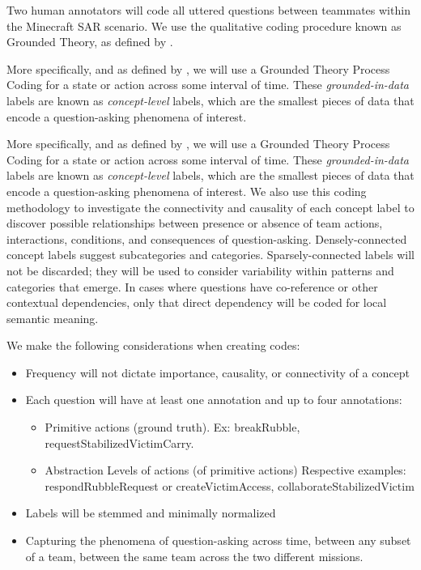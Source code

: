 Two human annotators will code all uttered questions between teammates within
the Minecraft SAR scenario.  We use the qualitative coding procedure known as
Grounded Theory, as defined by \citet{corbin_strauss_2015}. 

More specifically, and as defined by \citet{saldana_2021}, we will use a
Grounded Theory Process Coding for a state or action across some interval of
time. These \emph{grounded-in-data} labels are known as \emph{concept-level}
labels, which are the smallest pieces of data that encode a question-asking
phenomena of interest.

More specifically, and as defined by \citet{saldana_2021}, we will use a
Grounded Theory Process Coding for a state or action across some interval of
time. These \emph{grounded-in-data} labels are known as \emph{concept-level}
labels, which are the smallest pieces of data that encode a question-asking
phenomena of interest. We also use this coding methodology to investigate the connectivity and
causality of each concept label to discover possible relationships between
presence or absence of team actions, interactions, conditions, and consequences
of question-asking. Densely-connected concept labels suggest subcategories and
categories. Sparsely-connected labels will not be discarded; they will be used
to consider variability within patterns and categories that emerge. In cases
where questions have co-reference or other contextual dependencies, only that
direct dependency will be coded for local semantic meaning.

We make the following considerations when creating codes: 

\begin{itemize}
    \item Frequency will not dictate importance, causality, or connectivity of a concept
    \item Each question will have at least one annotation and up to four
      annotations:
    \begin{itemize}
        \item Primitive actions (ground truth). Ex: breakRubble,
          requestStabilizedVictimCarry.
        \item Abstraction Levels of actions (of primitive actions) Respective
          examples: respondRubbleRequest or createVictimAccess, collaborateStabilizedVictim
    \end{itemize}
    \item Labels will be stemmed and minimally normalized
    \item Capturing the phenomena of question-asking across time, between any subset of a team, between the same team across the two different missions. 
\end{itemize}


